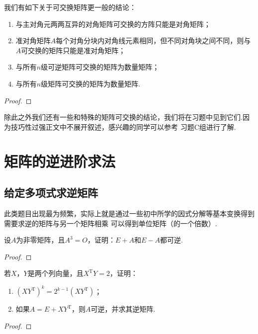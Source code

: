 \begin{theorem}
    我们有如下关于可交换矩阵更一般的结论：
    \begin{enumerate}
        \item 与主对角元两两互异的对角矩阵可交换的方阵只能是对角矩阵；

        \item 准对角矩阵$A$每个对角分块内对角线元素相同，但不同对角块之间不同，则与$A$可交换的矩阵只能是准对角矩阵；

        \item 与所有$n$级可逆矩阵可交换的矩阵为数量矩阵；

        \item 与所有$n$级矩阵可交换的矩阵为数量矩阵.
    \end{enumerate}
\end{theorem}
\begin{proof}
    
\end{proof}

除此之外我们还有一些和特殊的矩阵可交换的结论，我们将在习题中见到它们.因为技巧性过强正文中不展开叙述，感兴趣的同学可以参考
习题C组进行了解.

\section{矩阵的逆进阶求法}
\subsection{给定多项式求逆矩阵}
此类题目出现最为频繁，实际上就是通过一些初中所学的因式分解等基本变换得到需要求逆的矩阵与另一个矩阵相乘
可以得到单位矩阵（的一个倍数）.
\begin{example}
    设$A$为非零矩阵，且$A^3=O$，证明：$E+A$和$E-A$都可逆.
\end{example}
\begin{proof}
    
\end{proof}

\begin{example}
    若$X$，$Y$是两个列向量，且$X^\mathrm{T}Y=2$，证明：
    \begin{enumerate}
        \item $(XY^\mathrm{T})^k=2^{k-1}(XY^{\mathrm{T}})$；

        \item 如果$A=E+XY^\mathrm{T}$，则$A$可逆，并求其逆矩阵.
    \end{enumerate}
\end{example}
\begin{proof}
    
\end{proof}

